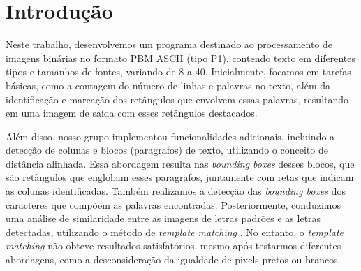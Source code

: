 \documentclass[english, 
               brazil, 
               bsc] %
               {dcomp-abntex2}
\begin{document}


\frenchspacing 




\pretextual




\orientador{}
\coorientador{}







%
%
\imprimircapa
%  
%     
\mostrarSUMARIO




\textual


\chapter{Introdução} \label{introduction}

Neste trabalho, desenvolvemos um programa destinado ao processamento de imagens binárias no formato PBM ASCII (tipo P1), contendo texto em diferentes tipos e tamanhos de fontes, variando de 8 a 40. Inicialmente, focamos em tarefas básicas, como a contagem do número de linhas e palavras no texto, além da identificação e marcação dos retângulos que envolvem essas palavras, resultando em uma imagem de saída com esses retângulos destacados.

Além disso, nosso grupo implementou funcionalidades adicionais, incluindo a detecção de colunas e blocos (paragrafos) de texto, utilizando o conceito de distância alinhada. Essa abordagem resulta nas \textit{bounding boxes} desses blocos, que são retângulos que englobam esses paragrafos, juntamente com retas que indicam as colunas identificadas. Também realizamos a detecção das \textit{bounding boxes} dos caracteres que compõem as palavras encontradas. Posteriormente, conduzimos uma análise de similaridade entre as imagens de letras padrões e as letras detectadas, utilizando o método de \textit{template matching} \cite[12.2]{gonzalez2008digital}. No entanto, o \textit{template matching} não obteve resultados satisfatórios, mesmo após testarmos diferentes abordagens, como a desconsideração da igualdade de pixels pretos ou brancos.
\end{document}
